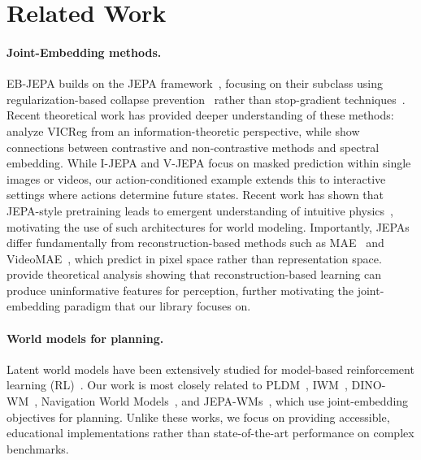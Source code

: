 \documentclass{article}
\begin{document}
\section{Related Work}

\paragraph{Joint-Embedding methods.}
EB-JEPA builds on the JEPA framework~\citep{IJEPA,VJEPA}, focusing on their subclass using regularization-based collapse prevention~\citep{VICReg,BarlowTwins,balestriero2025lejepaprovablescalableselfsupervised} rather than stop-gradient techniques~\citep{BYOL,SimSiam,DINOV2}.
Recent theoretical work has provided deeper understanding of these methods: \citet{InformationTheoPerspectiveVICREG2023} analyze VICReg from an information-theoretic perspective, while \citet{SLLspectralembeddings2022} show connections between contrastive and non-contrastive methods and spectral embedding.
While I-JEPA and V-JEPA focus on masked prediction within single images or videos, our action-conditioned example extends this to interactive settings where actions determine future states.
Recent work has shown that JEPA-style pretraining leads to emergent understanding of intuitive physics~\citep{garrido2025intuitivephysicsunderstandingemerges}, motivating the use of such architectures for world modeling.
Importantly, JEPAs differ fundamentally from reconstruction-based methods such as MAE~\citep{MAE} and VideoMAE~\citep{VideoMAE,VideoMAEv2}, which predict in pixel space rather than representation space.
\citet{ReconstructionUninformativebalestriero24b} provide theoretical analysis showing that reconstruction-based learning can produce uninformative features for perception, further motivating the joint-embedding paradigm that our library focuses on.

\paragraph{World models for planning.}
Latent world models have been extensively studied for model-based reinforcement learning (RL)~\citep{PlaNet,DreamerV3,TDMPC2}.
Our work is most closely related to PLDM~\citep{PLDM}, IWM~\citep{IWM}, DINO-WM~\citep{DINO-WM}, Navigation World Models~\citep{NWM_Bar_2025_CVPR}, and JEPA-WMs~\citep{terver2026JEPAWMs}, which use joint-embedding objectives for planning.
Unlike these works, we focus on providing accessible, educational implementations rather than state-of-the-art performance on complex benchmarks.
\end{document}
